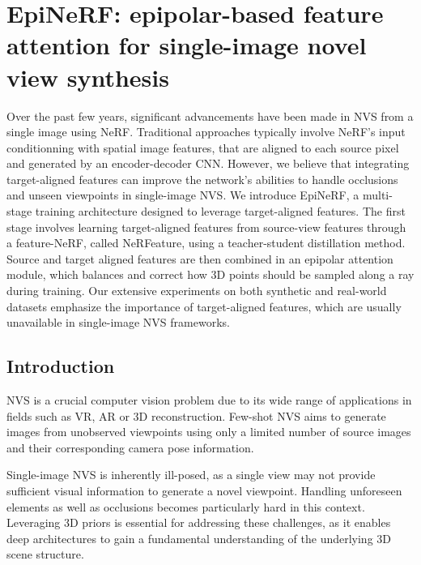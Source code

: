 \chapter{EpiNeRF: epipolar-based feature attention for single-image novel view synthesis}
\label{chapter:epinerf}



Over the past few years, significant advancements have been made in \ac{NVS} from a single image using \ac{NeRF}. Traditional approaches typically involve \ac{NeRF}'s input conditionning with spatial image features, that are aligned to each source pixel and generated by an encoder-decoder \ac{CNN}. However, we believe that integrating target-aligned features can improve the network's abilities to handle occlusions and unseen viewpoints in single-image \ac{NVS}. We introduce EpiNeRF, a multi-stage training architecture designed to leverage target-aligned features. The first stage involves learning target-aligned features from source-view features through a feature-\ac{NeRF}, called NeRFeature, using a teacher-student distillation method. Source and target aligned features are then combined in an epipolar attention module, which balances and correct how 3D points should be sampled along a ray during training. Our extensive experiments on both synthetic and real-world datasets emphasize the importance of target-aligned features, which are usually unavailable in single-image \ac{NVS} frameworks.

\section{Introduction}
\ac{NVS} is a crucial computer vision problem due to its wide range of applications in fields such as \ac{VR}, \ac{AR} or 3D reconstruction. Few-shot \ac{NVS} aims to generate images from unobserved viewpoints using only a limited number of source images and their corresponding camera pose information.

Single-image \ac{NVS} is inherently ill-posed, as a single view may not provide sufficient visual information to generate a novel viewpoint. Handling unforeseen elements as well as occlusions becomes particularly hard in this context. Leveraging 3D priors \citep{saito2019pifu,johari2022geonerf} is essential for addressing these challenges, as it enables deep architectures to gain a fundamental understanding of the underlying 3D scene structure.

